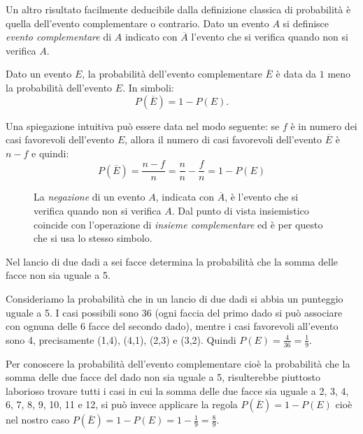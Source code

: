 Un altro risultato facilmente deducibile dalla definizione classica di 
probabilità è quella dell'evento complementare o contrario.
Dato un evento \(A\) si definisce \emph{evento complementare} di \(A\) indicato 
con 
\(\overline A\) l'evento che si verifica quando non si verifica \(A\).

\begin{teorema}
Dato un evento \(E\), la probabilità dell'evento complementare \(\overline E\) è 
data da \(1\) meno la probabilità dell'evento \(E\). In simboli: \[ P(\overline 
E)=1-P(E). \]
\end{teorema}
Una spiegazione intuitiva può essere data nel modo seguente:
se \(f\) è in numero dei casi favorevoli dell'evento \(E\), allora il numero di 
casi favorevoli dell'evento \(\overline 
E\) è \(n-f\) e quindi:
\[ P(\overline 
E)= \dfrac{n-f}{n}=\dfrac{n}{n}-\dfrac{f}{n}=1-P(E)\]

\begin{inaccessibleblock}
 \begin{figure}[htpb]
\begin{minipage}[c]{.35\textwidth}
\end{minipage}\hfil
\begin{minipage}[c]{.55\textwidth}
La \emph{negazione} di un evento \(A\), indicata con \(\overline A\), è 
l'evento che si verifica quando non si verifica \(A\). Dal punto di vista 
insiemistico coincide con l'operazione di \emph{insieme complementare} ed è 
per 
questo che si usa lo stesso simbolo.
\end{minipage}
\end{figure}
\end{inaccessibleblock}

\begin{esempio}
Nel lancio di due dadi a sei facce determina la probabilità che la somma 
delle 
facce non sia uguale a 5.

Consideriamo la probabilità che in un lancio di due dadi si abbia un 
punteggio 
uguale a 5. I casi possibili sono 36 (ogni faccia del primo dado si può 
associare con ognuna delle 6 facce del secondo dado), mentre i casi 
favorevoli 
all'evento sono 4, precisamente (1,4), (4,1), (2,3) e (3,2). Quindi 
\(P(E)=\frac 
4{36}=\frac 1 9\).

Per conoscere la probabilità dell'evento complementare cioè la probabilità 
che 
la somma delle due facce del dado non sia uguale a 5, risulterebbe piuttosto 
laborioso trovare tutti i casi in cui la somma delle due facce sia uguale a 
2, 
3, 4, 6, 7, 8, 9, 10, 11 e 12, si può invece applicare la regola \(P(\overline 
E)=1-P(E)\) cioè nel nostro caso \(P(\overline E)=1-P(E)=1-\frac 1 9=\frac 8 9\).
\end{esempio}


